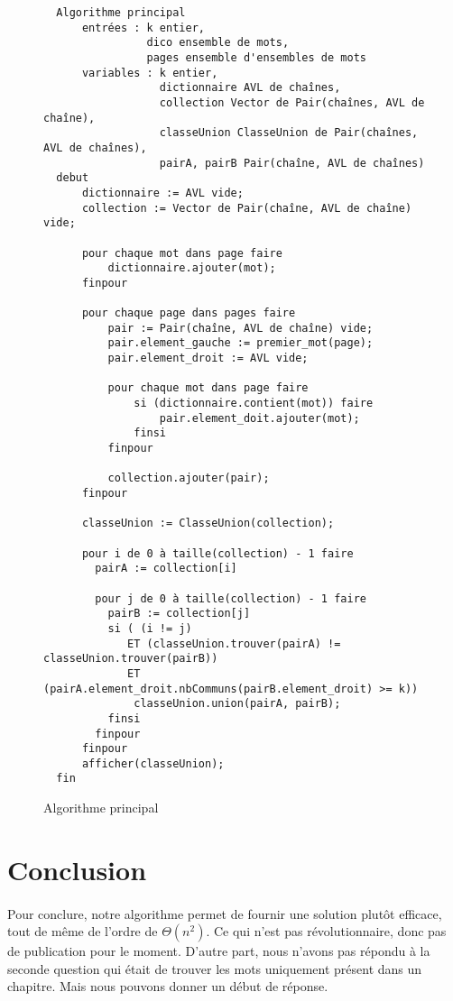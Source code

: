 \documentclass[a4paper]{article}
\begin{document}
   			\begin{figure}
	    	\begin{verbatim}
  Algorithme principal
      entrées : k entier,
                dico ensemble de mots,
                pages ensemble d'ensembles de mots
      variables : k entier,
                  dictionnaire AVL de chaînes,
                  collection Vector de Pair(chaînes, AVL de chaîne),
                  classeUnion ClasseUnion de Pair(chaînes, AVL de chaînes),
                  pairA, pairB Pair(chaîne, AVL de chaînes)
  debut
      dictionnaire := AVL vide;
      collection := Vector de Pair(chaîne, AVL de chaîne) vide;
      
      pour chaque mot dans page faire
          dictionnaire.ajouter(mot);
      finpour
          
      pour chaque page dans pages faire
          pair := Pair(chaîne, AVL de chaîne) vide;
          pair.element_gauche := premier_mot(page);
          pair.element_droit := AVL vide;
          
          pour chaque mot dans page faire
              si (dictionnaire.contient(mot)) faire
                  pair.element_doit.ajouter(mot);
              finsi
          finpour
          
          collection.ajouter(pair);
      finpour
      
      classeUnion := ClasseUnion(collection);
      
      pour i de 0 à taille(collection) - 1 faire
        pairA := collection[i]
          
        pour j de 0 à taille(collection) - 1 faire
          pairB := collection[j]
          si ( (i != j)
             ET (classeUnion.trouver(pairA) != classeUnion.trouver(pairB))
             ET (pairA.element_droit.nbCommuns(pairB.element_droit) >= k))
              classeUnion.union(pairA, pairB);
          finsi
        finpour
      finpour
      afficher(classeUnion);
  fin
	    	\end{verbatim}
   	    	\caption{Algorithme principal \label{algo_main}}
   	    	\end{figure}
	
	\newpage
			
	\section*{Conclusion}
		\paragraph{}{
		Pour conclure, notre algorithme permet de fournir une solution plutôt efficace, tout de
		même de l'ordre de $\Theta(n^{2})$. Ce qui n'est pas révolutionnaire, donc pas de publication
		pour le moment. D'autre part, nous n'avons pas répondu à la seconde question qui était de trouver les
		mots uniquement présent dans un chapitre. Mais nous pouvons donner un début de réponse. 
		}
		
\end{document}
